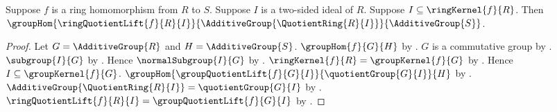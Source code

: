 \begin{theorem}\label{ring_quotient_lift_additive_hom}
    Suppose $f$ is a ring homomorphism from $R$ to $S$.
    Suppose $I$ is a two-sided ideal of $R$.
    Suppose $I\subseteq\ringKernel{f}{R}$.
    Then
        $\groupHom
            {\ringQuotientLift{f}{R}{I}}
            {\AdditiveGroup{\QuotientRing{R}{I}}}
            {\AdditiveGroup{S}}$.
\end{theorem}
\begin{proof}
    Let $G=\AdditiveGroup{R}$ and $H=\AdditiveGroup{S}$.
    $\groupHom{f}{G}{H}$ by
        .
    $G$ is a commutative group by
        .
    $\subgroup{I}{G}$ by
        .
    Hence $\normalSubgroup{I}{G}$ by
        .
    $\ringKernel{f}{R}=\groupKernel{f}{G}$ by .
    Hence $I\subseteq\groupKernel{f}{G}$.
    $\groupHom{\groupQuotientLift{f}{G}{I}}
        {\quotientGroup{G}{I}}{H}$ by
        .
    $\AdditiveGroup{\QuotientRing{R}{I}}=
        \quotientGroup{G}{I}$ by
        .
    $\ringQuotientLift{f}{R}{I}=\groupQuotientLift{f}{G}{I}$ by
        .
\end{proof}

